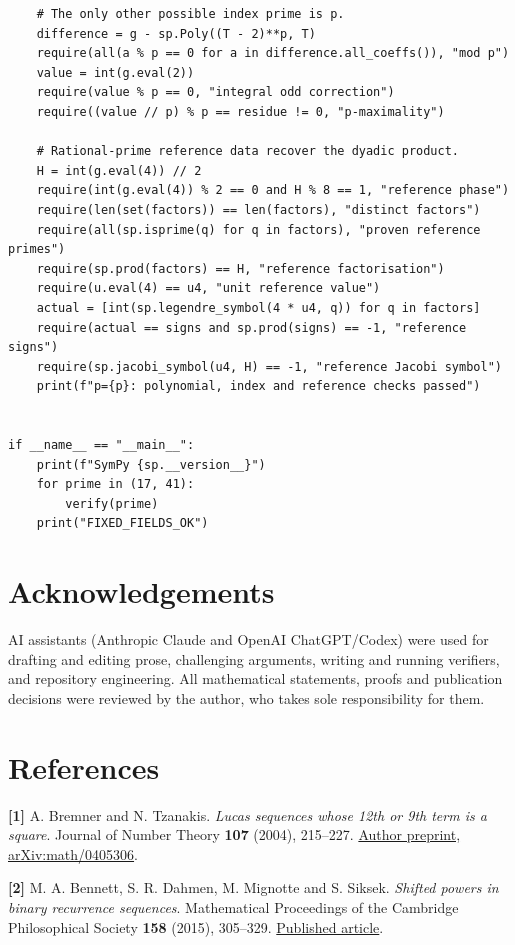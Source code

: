 \documentclass[11pt,a4paper]{article}
\begin{document}
\begin{verbatim}
    # The only other possible index prime is p.
    difference = g - sp.Poly((T - 2)**p, T)
    require(all(a % p == 0 for a in difference.all_coeffs()), "mod p")
    value = int(g.eval(2))
    require(value % p == 0, "integral odd correction")
    require((value // p) % p == residue != 0, "p-maximality")

    # Rational-prime reference data recover the dyadic product.
    H = int(g.eval(4)) // 2
    require(int(g.eval(4)) % 2 == 0 and H % 8 == 1, "reference phase")
    require(len(set(factors)) == len(factors), "distinct factors")
    require(all(sp.isprime(q) for q in factors), "proven reference primes")
    require(sp.prod(factors) == H, "reference factorisation")
    require(u.eval(4) == u4, "unit reference value")
    actual = [int(sp.legendre_symbol(4 * u4, q)) for q in factors]
    require(actual == signs and sp.prod(signs) == -1, "reference signs")
    require(sp.jacobi_symbol(u4, H) == -1, "reference Jacobi symbol")
    print(f"p={p}: polynomial, index and reference checks passed")


if __name__ == "__main__":
    print(f"SymPy {sp.__version__}")
    for prime in (17, 41):
        verify(prime)
    print("FIXED_FIELDS_OK")
\end{verbatim}

\section{Acknowledgements}\label{acknowledgements}

AI assistants (Anthropic Claude and OpenAI ChatGPT/Codex) were used for
drafting and editing prose, challenging arguments, writing and running
verifiers, and repository engineering. All mathematical statements,
proofs and publication decisions were reviewed by the author, who takes
sole responsibility for them.

\section{References}\label{references}

\protect{}\label{reference-1}
\textbf{{[}1{]}} A. Bremner and N. Tzanakis. \emph{Lucas sequences whose
12th or 9th term is a square}. Journal of Number Theory \textbf{107}
(2004), 215--227. \href{https://arxiv.org/abs/math/0405306}{Author
preprint, arXiv:math/0405306}.

\protect{}\label{reference-2}
\textbf{{[}2{]}} M. A. Bennett, S. R. Dahmen, M. Mignotte and S. Siksek.
\emph{Shifted powers in binary recurrence sequences}. Mathematical
Proceedings of the Cambridge Philosophical Society \textbf{158} (2015),
305--329. \href{https://doi.org/10.1017/S0305004114000681}{Published
article}.
\end{document}

